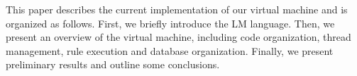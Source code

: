This paper describes the current implementation of
our virtual machine and is organized as follows. First, we
briefly introduce the LM language. Then, we present an overview of the virtual machine, including code organization,
thread management, rule execution and database organization. Finally, we present preliminary results and
outline some conclusions.
